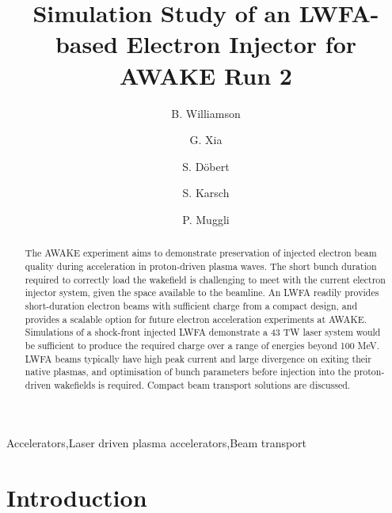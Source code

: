\documentclass[preprint,5p,times,sort&compress]{elsarticle}
\begin{document}
\begin{frontmatter}

\title{Simulation Study of an LWFA-based Electron Injector for AWAKE Run 2}


\author[Manchester,CI]{B. Williamson}
\author[Manchester,CI]{G. Xia}
\author[CERN]{S. D{\"o}bert}
\author[MPQ]{S. Karsch}
\author[CERN,MPI]{P. Muggli}

\address[Manchester]{The University of Manchester, Manchester, UK}
\address[CI]{Cockcroft Institute, Warrington, UK}
\address[CERN]{CERN, Geneva, Switzerland}
\address[MPQ]{Max Planck Institute for Quantum Optics, Garching, Germany}
\address[MPI]{Max Planck Institute for Physics, Munich, Germany}

\begin{abstract}
The AWAKE experiment aims to demonstrate preservation of injected electron beam quality during acceleration in proton-driven plasma waves. The short bunch duration required to correctly load the wakefield is challenging to meet with the current electron injector system, given the space available to the beamline. An LWFA readily provides short-duration electron beams with sufficient charge from a compact design, and provides a scalable option for future electron acceleration experiments at AWAKE. Simulations of a shock-front injected LWFA demonstrate a 43 TW laser system would be sufficient to produce the required charge over a range of energies beyond 100 MeV. LWFA beams typically have high peak current and large divergence on exiting their native plasmas, and optimisation of bunch parameters before injection into the proton-driven wakefields is required. Compact beam transport solutions are discussed.  
\end{abstract}

\begin{keyword}
Accelerators\sep Laser driven plasma accelerators\sep Beam transport
\end{keyword}

\end{frontmatter}

\section{Introduction}
\end{document}
